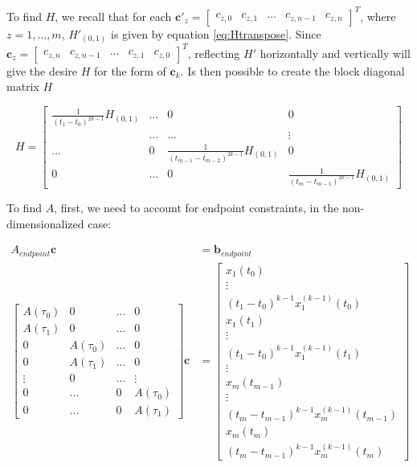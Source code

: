 \noindent To find $H$, we recall that for each $\mathbf{c}'_z=\begin{bmatrix}c_{z,0} & c_{z,1} & \dots & c_{z,n-1} & c_{z,n} \end{bmatrix}^T$, where $z=1,\dots,m$, $H'_{(0,1)}$ is given by equation \eqref{eq:Htranspose}. Since $\mathbf{c}_z=\begin{bmatrix}c_{z,n} & c_{z,n-1} & \dots & c_{z,1} & c_{z,0}\end{bmatrix}^T$, reflecting $H'$ horizontally and vertically will give the desire $H$ for the form of $\mathbf{c}_k$. Is then possible to create the block diagonal matrix $H$ 

\begin{equation}
	H = 
	\begin{bmatrix}
		\frac{1}{(t_1-t_0)^{2k-1}}H_{(0,1)} & \dots & 0 & 0 \\
		 & \dots & \dots & \vdots \\
		\dots & 0 & \frac{1}{(t_{m-1}-t_{m-2})^{2k-1}}H_{(0,1)} & 0 \\
		0 & \dots & 0 & \frac{1}{(t_m-t_{m-1})^{2k-1}}H_{(0,1)}
	\end{bmatrix}	
\end{equation}

\noindent To find $A$, first, we need to account for endpoint constraints, in the non-dimensionalized case:

\begin{align}
	A_{endpoint}\mathbf{c} &= \mathbf{b}_{endpoint} \\
	\begin{bmatrix}
		A(\tau_0) & 0         & \dots & 0         \\
		A(\tau_1) & 0         & \dots & 0         \\
		0         & A(\tau_0) & \dots & 0         \\
		0         & A(\tau_1) & \dots & 0         \\
		\vdots    & 0         & \dots & \vdots    \\
		0         & \dots     & 0     & A(\tau_0) \\
		0         & \dots     & 0     & A(\tau_1)            
	\end{bmatrix}
	\mathbf{c} &= 
	\begin{bmatrix}
		x_1(t_0) 								\\
		\vdots   								\\
		(t_1-t_0)^{k-1}x_1^{(k-1)}(t_0) 		\\
		x_1(t_1) 								\\
		\vdots   								\\
		(t_1-t_0)^{k-1}x_1^{(k-1)}(t_1) 		\\
		\vdots   								\\
		x_m(t_{m-1}) 							\\
		\vdots                                  \\
		(t_m-t_{m-1})^{k-1}x_m^{(k-1)}(t_{m-1}) \\
		x_m(t_m)                                \\
		(t_m-t_{m-1})^{k-1}x_m^{(k-1)}(t_m)
	\end{bmatrix} \nonumber
\end{align}

